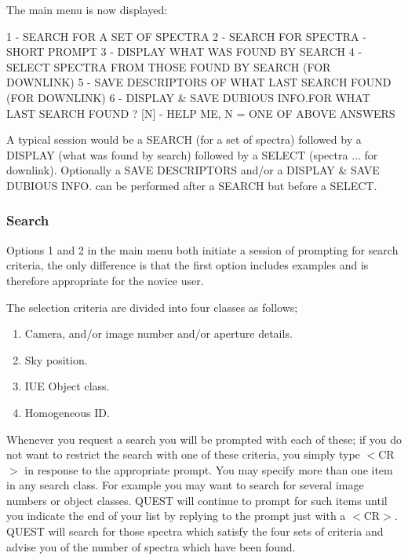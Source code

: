 \documentclass[11pt,nolof,noabs]{starlink}
\begin{document}
The main menu is now displayed:
\begin{terminalv}
1      -      SEARCH FOR A SET OF SPECTRA
2      -      SEARCH FOR SPECTRA - SHORT PROMPT
3      -      DISPLAY WHAT WAS FOUND BY SEARCH
4      -      SELECT SPECTRA FROM THOSE FOUND BY SEARCH (FOR DOWNLINK)
5      -      SAVE DESCRIPTORS OF WHAT LAST SEARCH FOUND (FOR DOWNLINK)
6      -      DISPLAY & SAVE DUBIOUS INFO.FOR WHAT LAST SEARCH FOUND
? [N]  -      HELP ME, N = ONE OF ABOVE ANSWERS
\end{terminalv}
A typical session would be a SEARCH (for a set of spectra) followed
by a DISPLAY (what was found by search)
followed by a SELECT (spectra $\ldots$ for downlink).
Optionally a SAVE DESCRIPTORS and/or a DISPLAY \& SAVE DUBIOUS INFO.
can be performed after a SEARCH but before a SELECT.

\subsubsection{Search}%
Options 1 and 2 in the main menu both initiate a session of prompting for search
criteria, the only difference is that the first option  includes examples
and is therefore appropriate for the novice user.

The selection criteria are divided into four classes as follows;
\begin{enumerate}
\item Camera, and/or image number and/or aperture details.
\item Sky position.
\item IUE Object class.
\item Homogeneous ID.
\end{enumerate}
Whenever you request a search you will be prompted with each of these;
if you do not want to restrict the search with one of these criteria,
you simply type $<$CR$>$ in response to the appropriate prompt.
You may specify more than one item in any search class. For
example you may want to search for several image numbers or object classes.
QUEST will continue to prompt for such items until you indicate the end of your
list by replying to the prompt just with a $<$CR$>$.
QUEST will search for those spectra which satisfy the four sets of
criteria and advise you of the number of spectra which have been found.
\end{document}
